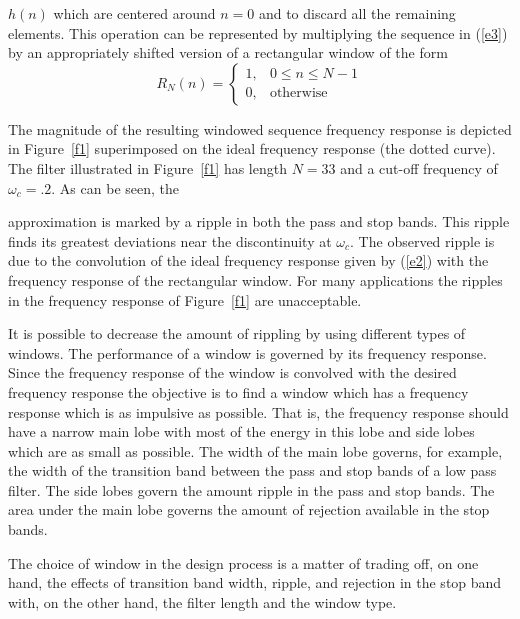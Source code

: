 $h(n)$ which are centered around $n=0$ and to discard 
all the remaining elements.  This operation can
be represented by multiplying the sequence in (\ref{e3}) by an 
appropriately shifted version of a rectangular window of the form
%
\begin{equation}
R_N(n)=\left\{ \begin{array}{ll}
                     1, & \mbox{$0 \leq n \leq N-1$}\\
                     0, & \mbox{otherwise}
                \end{array}
       \right.
\label{e4}
\end{equation}
%

The magnitude of the resulting windowed sequence frequency response 
is depicted in Figure~\ref{f1} superimposed on the ideal frequency
response (the dotted curve).  The filter illustrated in Figure~\ref{f1} 
has length $N=33$ and
a cut-off frequency of $\omega_c=.2$.  As can be seen, the 
%

%
approximation is marked by a ripple in both the pass
and stop bands.  This ripple finds its greatest deviations near the discontinuity
at $\omega_c$.  The observed ripple is due to the convolution of the
ideal frequency response given by (\ref{e2}) with the frequency response
of the rectangular window.  For many applications the ripples in the frequency 
response of Figure~\ref{f1} are unacceptable.

It is possible to decrease the amount of rippling by using different 
types of windows.
The performance of a window is governed by its frequency response.
Since the
frequency response of the window is convolved with the 
desired frequency response the 
objective is to find a window which has a frequency response which
is as impulsive as possible.  That is,  the frequency response 
should have a narrow main lobe with most of the energy
in this lobe and side lobes which are as small as possible.
The width of the main lobe governs, for example, the width
of the transition band between the pass and stop 
bands of a low pass filter.  The side lobes govern the amount 
ripple in the pass and stop bands.  The area under the main lobe
governs the amount of rejection available in
the stop bands. 

The choice of window in the design process is a matter
of trading off, on one hand, the effects of 
transition band width, ripple, and rejection in the stop band with,
on the other hand, the filter length and the window type.

